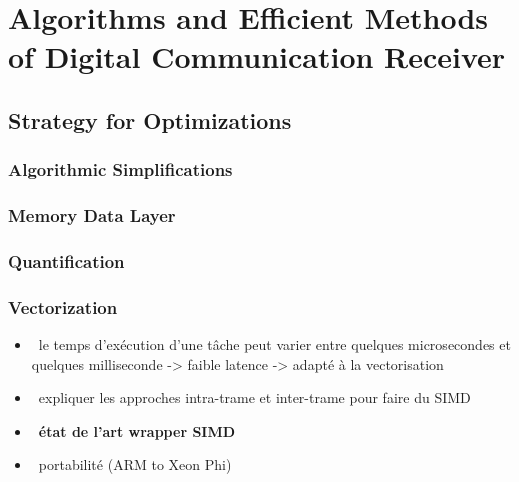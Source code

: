 \graphicspath{{main/chapter2/fig/}}

\chapter{Algorithms and Efficient Methods of Digital Communication Receiver}

\minitoccustom

\section{Strategy for Optimizations}

\subsection{Algorithmic Simplifications}

\subsection{Memory Data Layer}

\subsection{Quantification}

\subsection{Vectorization~\cite{Cassagne2018}}

\begin{itemize}
  \item \xmark~le temps d'exécution d'une tâche peut varier entre quelques
    microsecondes et quelques milliseconde -> faible latence -> adapté à la
    vectorisation
  \item \xmark~expliquer les approches intra-trame et inter-trame pour faire du
    SIMD
  \item \cmark~\textbf{état de l'art wrapper SIMD}
  \item \cmark~portabilité (ARM to Xeon Phi)
\end{itemize}

